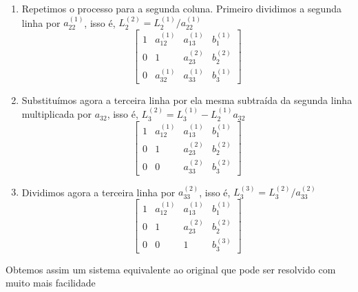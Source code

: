 \begin{exemplos}[2]
\begin{exemplo}
\begin{enumerate}
                isso é, $L_3^{(1)} = L_3^{(0)} - L_1^{(1)}a_{31}$
                \[ \left[
                \begin{array}{ccc|c}
                   	1 & a_{12}^{(1)} & a_{13}^{(1)} & b_{1}^{(1)} \\
                   	0 & a_{22}^{(1)} & a_{23}^{(1)} & b_{2}^{(1)} \\
                   	0 & a_{32}^{(1)} & a_{33}^{(1)} & b_{3}^{(1)}
                \end{array} 
                \right] \]
            \item Repetimos o processo para a segunda coluna. Primeiro dividimos a segunda 
                linha por $a_{22}^{(1)}$, isso é, $L_2^{(2)} = L_2^{(1)} / a_{22}^{(1)}$
                \[ \left[
                \begin{array}{ccc|c}
                   	1 & a_{12}^{(1)} & a_{13}^{(1)} & b_{1}^{(1)} \\
                   	0 &      1       & a_{23}^{(2)} & b_{2}^{(2)} \\
                   	0 & a_{32}^{(1)} & a_{33}^{(1)} & b_{3}^{(1)}
                \end{array} 
                \right] \]
            \item Substituímos agora a terceira linha por ela mesma subtraída da segunda 
                linha multiplicada por $a_{32}$, isso é, $L_3^{(2)} = L_3^{(1)} - L_2^{(1)}a_{32}$
                \[ \left[
                \begin{array}{ccc|c}
                   	1 & a_{12}^{(1)} & a_{13}^{(1)} & b_{1}^{(1)} \\
                   	0 &      1       & a_{23}^{(2)} & b_{2}^{(2)} \\
                   	0 &      0       & a_{33}^{(2)} & b_{3}^{(2)}
                \end{array} 
                \right] \]
            \item Dividimos agora a terceira linha por $a_{33}^(2)$, isso é, $L_3^{(3)} = L_3^{(2)} / a_{33}^{(2)}$
                \[ \left[
                \begin{array}{ccc|c}
                   	1 & a_{12}^{(1)} & a_{13}^{(1)} & b_{1}^{(1)} \\
                   	0 &      1       & a_{23}^{(2)} & b_{2}^{(2)} \\
                   	0 &      0       &      1       & b_{3}^{(3)}
                \end{array} 
                \right] \]
        \end{enumerate}
        Obtemos assim um sistema equivalente ao original que pode ser resolvido com muito mais facilidade
    \end{exemplo}


\end{exemplos}
